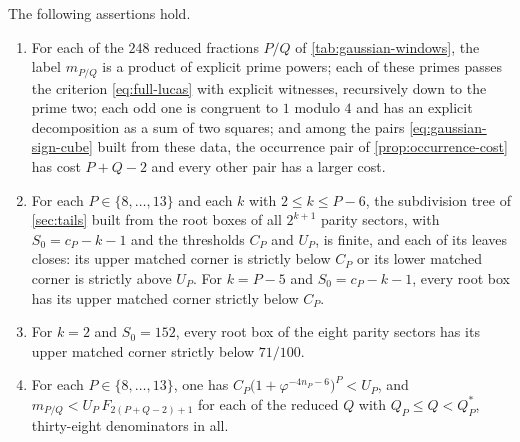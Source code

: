 \begin{proposition}\label{prop:finite-verifications}
The following assertions hold.
\begin{enumerate}[label=\textup{(\roman*)},ref=\textup{(\roman*)},leftmargin=*]
\item\label{it:fv-windows} For each of the $248$ reduced fractions $P/Q$ of
 \cref{tab:gaussian-windows}, the label $m_{P/Q}$ is a product of explicit
 prime powers; each of these primes passes the criterion \eqref{eq:full-lucas}
 with explicit witnesses, recursively down to the prime two; each odd one is
 congruent to $1$ modulo $4$ and has an explicit decomposition as a sum of two
 squares; and among the pairs \eqref{eq:gaussian-sign-cube} built from these
 data, the occurrence pair of \cref{prop:occurrence-cost} has cost $P+Q-2$ and
 every other pair has a larger cost.
\item\label{it:fv-covers} For each $P\in\{8,\ldots,13\}$ and each $k$ with $2\leqslant k\leqslant P-6$,
 the subdivision tree of \cref{sec:tails} built from the root boxes of all
 $2^{k+1}$ parity sectors, with $S_0=c_P-k-1$ and the thresholds $C_P$ and
 $U_P$, is finite, and each of its leaves closes: its upper matched corner is
 strictly below $C_P$ or its lower matched corner is strictly above $U_P$.
 For $k=P-5$ and $S_0=c_P-k-1$, every root box has its upper matched corner
 strictly below $C_P$.
\item\label{it:fv-lower} For $k=2$ and $S_0=152$, every root box of the eight parity sectors has
 its upper matched corner strictly below $71/100$.
\item\label{it:fv-sources} For each $P\in\{8,\ldots,13\}$, one has
 $C_P\bigl(1+\varphi^{-4n_P-6}\bigr)^P<U_P$, and
 $m_{P/Q}<U_P\,F_{2(P+Q-2)+1}$ for each of the reduced $Q$ with
 $Q_P\leqslant Q<Q^*_P$, thirty-eight denominators in all.
\end{enumerate}
\end{proposition}

